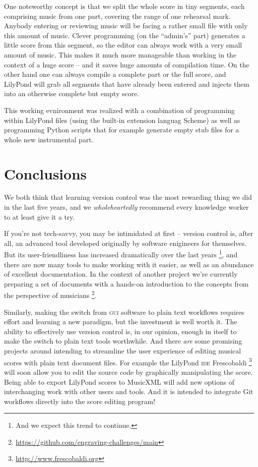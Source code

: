 \documentclass[11pt,a4paper]{article}
\begin{document}
One noteworthy concept is that we split the whole score in tiny segments, each comprising
music from one part, covering the range of one rehearsal mark. Anybody entering or
reviewing music will be facing a rather small file with only this amount of music.
Clever programming (on the “admin's” part) generates a little score from this segment, so
the editor can always work with a very small amount of music. This makes it much more
manageable than working in the context of a huge score -- and it saves huge amounts of
compilation time.
On the other hand one can always compile a complete part or the full score, and LilyPond
will grab all segments that have already been entered and injects them into an otherwise
complete but empty score.

This working evnironment was realized with a combination of programming within LilyPond files (using the built-in extension languag Scheme) as well as programming Python scripts
that for example generate empty stub files for a whole new instrumental part.

\section{Conclusions}\label{sec:conclusions}

We both think that learning version control was the most rewarding thing we did
in the last five years, and we \emph{wholeheartedly} recommend every knowledge
worker to at least give it a try.

If you're not tech-savvy, you may be intimidated at first -- version control
is, after all, an advanced tool developed originally by software enigineers
for themselves.  But its user-friendliness has increased dramatically over the
last years%
\footnote{And we expect this trend to continue.},
and there are now many tools to make working with it easier, as well as an abundance
of excellent documentation.
In the context of another project we're currently preparing a set of documents with a
hands-on introduction to the concepts from the perspective of musicians%
\footnote{\url{https://github.com/engraving-challenges/main}}.

Similarly, making the switch from \textsc{gui} software to plain text workflows
requires effort and learning a new paradigm, but the investment is well worth it.
The ability to effectively use version control is, in our opinion, enough in itself
to make the switch to plain text tools worthwhile. 
And there \emph{are} some promising projects around intending to streamline the user
experience of editing musical scores with plain text document files. For example the
LilyPond \textsc{ide} Frescobaldi%
\footnote{\url{http://www.frescobaldi.org}}
will soon allow you to edit the source code by graphically manipulating the score.
Being able to export LilyPond scores to MusicXML will add new options of interchanging
work with other users and tools.
And it is intended to integrate Git workflows directly into the score editing program!
\end{document}
